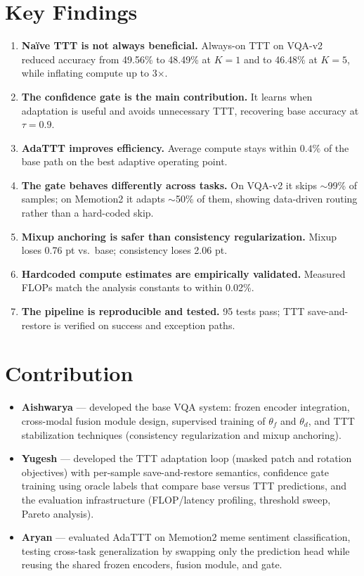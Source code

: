 \documentclass[conference]{IEEEtran}
\begin{document}
\section{Key Findings}

\begin{enumerate}
    \item \textbf{Naïve TTT is not always beneficial.} Always-on TTT on
    VQA-v2 reduced accuracy from 49.56\% to 48.49\% at $K{=}1$ and to
    46.48\% at $K{=}5$, while inflating compute up to 3$\times$.
    \item \textbf{The confidence gate is the main contribution.} It
    learns when adaptation is useful and avoids unnecessary TTT, recovering
    base accuracy at $\tau{=}0.9$.
    \item \textbf{AdaTTT improves efficiency.} Average compute stays
    within $0.4\%$ of the base path on the best adaptive operating point.
    \item \textbf{The gate behaves differently across tasks.} On VQA-v2
    it skips $\sim$99\% of samples; on Memotion2 it adapts $\sim$50\% of
    them, showing data-driven routing rather than a hard-coded skip.
    \item \textbf{Mixup anchoring is safer than consistency regularization.}
    Mixup loses 0.76 pt vs.\ base; consistency loses 2.06 pt.
    \item \textbf{Hardcoded compute estimates are empirically validated.}
    Measured FLOPs match the analysis constants to within 0.02\%.
    \item \textbf{The pipeline is reproducible and tested.} 95 tests
    pass; TTT save-and-restore is verified on success and exception
    paths.
\end{enumerate}

\section{Contribution}
\begin{itemize}
    \item \textbf{Aishwarya} --- developed the base VQA system: frozen
    encoder integration, cross-modal fusion module design, supervised
    training of $\theta_f$ and $\theta_d$, and TTT stabilization
    techniques (consistency regularization and mixup anchoring).

    \item \textbf{Yugesh} --- developed the TTT adaptation loop (masked
    patch and rotation objectives) with per-sample save-and-restore
    semantics, confidence gate training using oracle labels that compare
    base versus TTT predictions, and the evaluation infrastructure
    (FLOP/latency profiling, threshold sweep, Pareto analysis).

    \item \textbf{Aryan} --- evaluated AdaTTT on Memotion2 meme sentiment
    classification, testing cross-task generalization by swapping only
    the prediction head while reusing the shared frozen encoders, fusion
    module, and gate.
\end{itemize}
\end{document}
